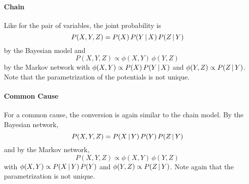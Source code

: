 		\paragraph{Chain}
			\begin{center}
			\end{center}
			Like for the pair of variables, the joint probability is
			\begin{equation}
				P(X, Y, Z) = P(X) \, P(Y \,\vert\, X) \, P(Z \,\vert\, Y)
			\end{equation}
			by the Bayesian model and
			\begin{equation}
				P(X, Y, Z) \propto \phi(X, Y) \, \phi(Y, Z)
			\end{equation}
			by the Markov network with \( \phi(X, Y) \propto P(X) \, P(Y \,\vert\, X) \) and \( \phi(Y, Z) \propto P(Z \,\vert\, Y) \). Note that the parametrization of the potentials is not unique.

		\paragraph{Common Cause}
			\begin{center}
			\end{center}
			For a common cause, the conversion is again similar to the chain model. By the Bayesian network,
			\begin{equation}
				P(X, Y, Z) = P(X \,\vert\, Y) \, P(Y) \, P(Z \,\vert\, Y)
			\end{equation}
			and by the Markov network,
			\begin{equation}
				P(X, Y, Z) \propto \phi(X, Y) \, \phi(Y, Z)
			\end{equation}
			with \( \phi(X, Y) \propto P(X \,\vert\, Y) \, P(Y) \) and \( \phi(Y, Z) \propto P(Z \,\vert\, Y) \). Note again that the parametrization is not unique.

